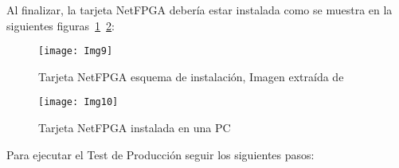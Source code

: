 Al finalizar, la tarjeta NetFPGA debería estar instalada como se muestra en la siguientes figuras~\ref{fig:Img9}~\ref{fig:Img10}:

\begin{figure}[h!] 
\centering    
\texttt{[image: Img9]}
\caption[Tarjeta NetFPGA esquema de instalación]{Tarjeta NetFPGA esquema de instalación, Imagen extra\'ida de \citep{NetFPGA6}}
\label{fig:Img9}
\end{figure}

\newpage
\begin{figure}[htbp!] 
\centering    
\texttt{[image: Img10]}
\caption[Tarjeta NetFPGA instalada en una PC]{Tarjeta NetFPGA instalada en una PC}
\label{fig:Img10}
\end{figure}

Para ejecutar el Test de Producción seguir los siguientes pasos:

